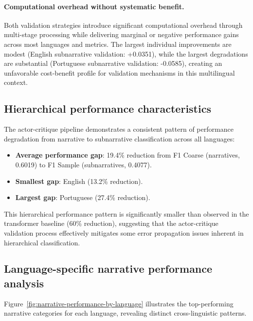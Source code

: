 \paragraph{Computational overhead without systematic benefit.} Both validation strategies introduce significant computational overhead through multi-stage processing while delivering marginal or negative performance gains across most languages and metrics. The largest individual improvements are modest (English subnarrative validation: +0.0351), while the largest degradations are substantial (Portuguese subnarrative validation: -0.0585), creating an unfavorable cost-benefit profile for validation mechanisms in this multilingual context.

\subsection{Hierarchical performance characteristics}

The actor-critique pipeline demonstrates a consistent pattern of performance degradation from narrative to subnarrative classification across all languages:

\begin{itemize}
    \item \textbf{Average performance gap}: 19.4\% reduction from F1 Coarse (narratives, 0.6019) to F1 Sample (subnarratives, 0.4077).
    \item \textbf{Smallest gap}: English (13.2\% reduction).
    \item \textbf{Largest gap}: Portuguese (27.4\% reduction).
\end{itemize}

This hierarchical performance pattern is significantly smaller than observed in the transformer baseline (60\% reduction), suggesting that the actor-critique validation process effectively mitigates some error propagation issues inherent in hierarchical classification.

\subsection{Language-specific narrative performance analysis}

Figure~\ref{fig:narrative-performance-by-language} illustrates the top-performing narrative categories for each language, revealing distinct cross-linguistic patterns.

